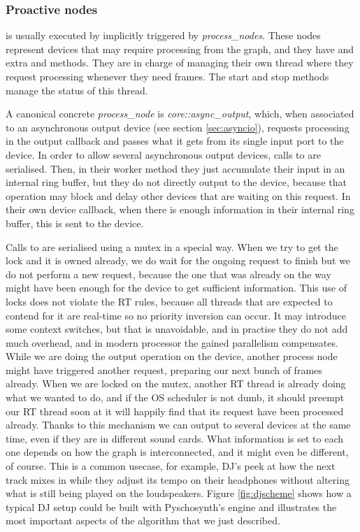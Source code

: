 \subsubsection{Proactive nodes}

 is usually executed by implicitly triggered by
\emph{process\_nodes}. These nodes represent
devices that may require processing from the graph, and they have and
extra  and  methods. They are in charge of
managing their own thread where they request processing whenever they
need frames. The start and stop methods manage the status of this thread.

A canonical concrete \emph{process\_node} is
\emph{core::async\_output}, which, when associated to an asynchronous
output device (see section \ref{sec:asyncio}), requests processing in
the output callback and passes what it gets from its single input port
to the device. In order to allow several asynchronous output devices,
calls to  are serialised. Then, in their
worker method they just accumulate their input in an internal ring
buffer, but they do not directly output to the device, because that
operation may block and delay other devices that are waiting on this
request. In their own device callback, when there is enough
information in their internal ring buffer, this is sent to the device.

Calls to  are serialised using a mutex in a
special way. When we try to get the lock and it is owned already, we
do wait for the ongoing request to finish but we do not perform a new
request, because the one that was already on the way might have been
enough for the device to get sufficient information. This use of locks
does not violate the RT rules, because all threads that are expected
to contend for it are real-time so no priority inversion can occur. It
may introduce some context switches, but that is unavoidable, and in
practise they do not add much overhead, and in modern processor the
gained parallelism compensates. While we are doing the output
operation on the device, another process node might have triggered
another request, preparing our next bunch of frames already. When we
are locked on the mutex, another RT thread is already doing what we
wanted to do, and if the OS scheduler is not dumb, it should preempt
our RT thread soon at it will happily find that its request have been
processed already. Thanks to this mechanism we can output to several
devices at the same time, even if they are in different sound
cards. What information is set to each one depends on how the graph is
interconnected, and it might even be different, of course. This is a
common usecase, for example, DJ's peek at how the next track mixes
in while they adjust its tempo on their headphones without altering
what is still being played on the loudspeakers. Figure
\ref{fig:djscheme} shows how a typical DJ setup could be built with
Pyschosynth's engine and illustrates the most important aspects of the
algorithm that we just described.

